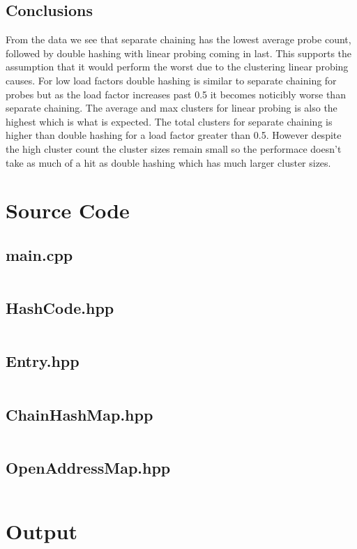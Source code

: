 \documentclass[titlepage]{article}
\begin{document}
\subsection{Conclusions}
From the data we see that separate chaining has the lowest average probe 
count, followed by double hashing with linear probing coming in last. This 
supports the assumption that it would perform the worst due to the clustering 
linear probing causes. For low load factors double hashing is similar to 
separate chaining for probes but as the load factor increases past 0.5 it 
becomes noticibly worse than separate chaining. The average and max clusters 
for linear probing is also the highest which is what is expected. The total 
clusters for separate chaining is higher than double hashing for a load factor 
greater than 0.5. However despite the high cluster count the cluster sizes remain 
small so the performace doesn't take as much of a hit as double hashing which has 
much larger cluster sizes.

 \newpage

\section{Source Code}
\subsection{main.cpp}
\inputminted{c++}{../../src/main.cpp}
\subsection{HashCode.hpp}
\inputminted{c++}{../../include/HashCode.hpp}
\subsection{Entry.hpp}
\inputminted{c++}{../../include/Entry.hpp}
\subsection{ChainHashMap.hpp}
\inputminted{c++}{../../include/ChainHashMap.hpp}
\subsection{OpenAddressMap.hpp}
\inputminted{c++}{../../include/OpenAddressMap.hpp}

\section{Output}
\end{document}

